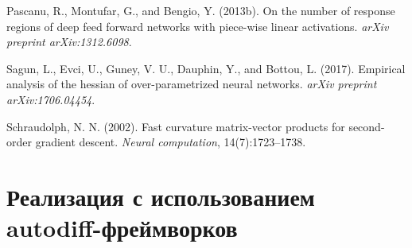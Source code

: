 \documentclass[11pt]{article}
\begin{document}
\begin{thebibliography}{10}
  Pascanu, R., Montufar, G., and Bengio, Y. (2013b).
  \newblock On the number of response regions of deep feed forward networks with piece-wise linear activations.
  \newblock \textit{arXiv preprint arXiv:1312.6098}.

  Sagun, L., Evci, U., Guney, V. U., Dauphin, Y., and Bottou, L. (2017).
  \newblock Empirical analysis of the hessian of over-parametrized neural networks.
  \newblock \textit{arXiv preprint arXiv:1706.04454}.

  Schraudolph, N. N. (2002).
  \newblock Fast curvature matrix-vector products for second-order gradient descent.
  \newblock \textit{Neural computation}, 14(7):1723--1738.
\end{thebibliography}

\newpage
\appendix
\section{Реализация с использованием autodiff-фреймворков}
\end{document}
